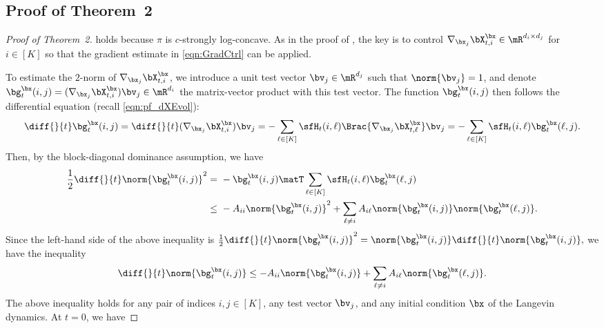 \documentclass[11pt]{article}
\begin{document}
\subsection{Proof of Theorem~2}
\label{app:thm_diag_loc}

\begin{proof}[Proof of Theorem~2]

 holds because $\pi$ is $c$-strongly log-concave. As in the proof of , the key is to control $\nabla_{\bx_j} \bX_{t,i}^\bx \in \mR^{d_i\times d_j}$ for $i\in[K]$ so that the gradient estimate in \eqref{eqn:GradCtrl} can be applied. 


To estimate the $2$-norm of $\nabla_{\bx_j} \bX_{t,i}^\bx$, we introduce a unit test vector $\bv_j \in \mR^{d_j}$ such that $\norm{\bv_j} = 1$, and denote $\bg_t^\bx(i,j) = (\nabla_{\bx_j} \bX_{t,i}^\bx)  \bv_j \in \mR^{d_i}$ the matrix-vector product with this test vector. The function $\bg_t^\bx(i,j)$ then follows the differential equation (recall \eqref{eqn:pf_dXEvol}):
\begin{equation}
    \diff{}{t} \bg_t^\bx(i,j) = \diff{}{t} (\nabla_{\bx_j} \bX_{t,i}^\bx) \bv_j = - \sum_{\ell \in [K]} \sfH_{t}(i,\ell) \Brac{ \nabla_{\bx_j} \bX_{t,\ell}^\bx } \bv_j = - \sum_{\ell \in [K]} \sfH_t(i,\ell) \bg_t^\bx(\ell,j).
\end{equation}
Then, by the block-diagonal dominance assumption, we have
\begin{equation}
\begin{split}
    \frac{1}{2} \diff{}{t} \norm{ \bg_t^\bx(i,j) }^2 =~& - \bg_t^\bx(i,j)\matT \sum_{\ell \in [K]} \sfH_t(i,\ell) \bg_t^\bx(\ell,j) \\
    \le~& - A_{ii} \norm{ \bg_t^\bx(i,j) }^2 + \sum_{\ell\neq i} A_{i\ell} \norm{ \bg_t^\bx(i,j) } \norm{ \bg_t^\bx(\ell,j) }.
\end{split}
\end{equation}
Since the left-hand side of the above inequality is
\(
    \frac{1}{2} \diff{}{t} \norm{ \bg_t^\bx(i,j) }^2 =  \norm{ \bg_t^\bx(i,j) } \diff{}{t} \norm{ \bg_t^\bx(i,j) },
\)
we have the inequality
\begin{equation}
\label{eqn:pf_diag_ineq}
    \diff{}{t} \norm{ \bg_t^\bx(i,j) } \le - A_{ii} \norm{ \bg_t^\bx(i,j) } + \sum_{\ell \neq i} A_{i\ell} \norm{ \bg_t^\bx(\ell,j) }.
\end{equation}
The above inequality holds for any pair of indices $i,j \in [K]$, any test vector $\bv_j$, and any initial condition $\bx$ of the Langevin dynamics.
At $t=0$, we have

\end{proof}
\end{document}
